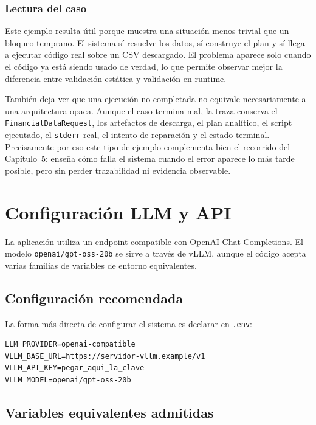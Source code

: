\subsubsection{Lectura del caso}

Este ejemplo resulta \'util porque muestra una situaci\'on menos trivial que un bloqueo temprano. El sistema s\'i resuelve los datos, s\'i construye el plan y s\'i
llega a ejecutar c\'odigo real sobre un CSV descargado. El problema aparece solo cuando el c\'odigo ya est\'a siendo usado de verdad, lo que permite observar
mejor la diferencia entre validaci\'on est\'atica y validaci\'on en runtime.

Tambi\'en deja ver que una ejecuci\'on no completada no equivale necesariamente a una arquitectura opaca. Aunque el caso termina mal, la traza conserva el
\texttt{FinancialDataRequest}, los artefactos de descarga, el plan anal\'itico, el script ejecutado, el \texttt{stderr} real, el intento de reparaci\'on y el
estado terminal. Precisamente por eso este tipo de ejemplo complementa bien el recorrido del Cap\'itulo~5: ense\~na c\'omo falla el sistema cuando el error aparece
lo m\'as tarde posible, pero sin perder trazabilidad ni evidencia observable.

\section{Configuraci\'on LLM y API}

La aplicaci\'on utiliza un endpoint compatible con OpenAI Chat Completions. El modelo \texttt{openai/gpt-oss-20b} \cite{openai2025gptossmodelcard} se sirve a trav\'es de vLLM, aunque el c\'odigo acepta varias familias de variables de entorno equivalentes.

\subsection{Configuraci\'on recomendada}

La forma m\'as directa de configurar el sistema es declarar en \texttt{.env}:

\begin{verbatim}
LLM_PROVIDER=openai-compatible
VLLM_BASE_URL=https://servidor-vllm.example/v1
VLLM_API_KEY=pegar_aqui_la_clave
VLLM_MODEL=openai/gpt-oss-20b
\end{verbatim}

\subsection{Variables equivalentes admitidas}

